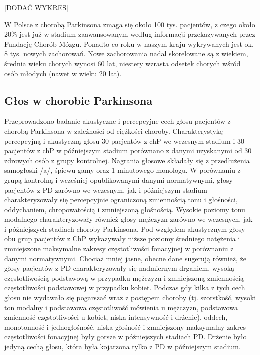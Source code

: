 [DODAĆ WYKRES]


W Polsce z chorobą Parkinsona zmaga się około 100 tys. pacjentów, z czego około 20\% jest już w stadium zaawansowanym
według informacji przekazywanych przez Fundację Chorób Mózgu.
Ponadto co roku w naszym kraju wykrywanych jest ok. 8 tys. nowych zachorowań.
Nowe zachorowania nadal skorelowane są z wiekiem, średnia wieku chorych wynosi 60 lat, niestety wzrasta odsetek chorych wśród osób młodych (nawet w wieku 20 lat).


\subsection{Głos w chorobie Parkinsona}
\label{subsec:glospd}

Przeprowadzono badanie akustyczne i percepcyjne cech głosu pacjentów z chorobą Parkinsona w zależności od ciężkości choroby.
Charakterystykę percepcyjną i akustyczną głosu 30 pacjentów z chP we wczesnym stadium i 30 pacjentów z chP w późniejszym
stadium porównano z danymi uzyskanymi od 30 zdrowych osób z grupy kontrolnej.
Nagrania głosowe składały się z przedłużenia samogłoski /a/, śpiewu gamy oraz 1-minutowego monologu.
W porównaniu z grupą kontrolną i wcześniej opublikowanymi danymi normatywnymi, głosy pacjentów z PD zarówno we wczesnym,
jak i późniejszym stadium charakteryzowały się percepcyjnie ograniczoną zmiennością tonu i głośności, oddychaniem,
chropowatością i zmniejszoną głośnością.
Wysokie poziomy tonu modalnego charakteryzowały również głosy mężczyzn zarówno we wczesnych, jak i późniejszych stadiach choroby Parkinsona.
Pod względem akustycznym głosy obu grup pacjentów z ChP wykazywały niższe poziomy średniego natężenia i zmniejszone maksymalne
zakresy częstotliwości fonacyjnej w porównaniu z danymi normatywnymi.
Chociaż mniej jasne, obecne dane sugerują również, że głosy pacjentów z PD charakteryzowały się nadmiernym drganiem, wysoką
częstotliwością podstawową w przypadku mężczyzn i zmniejszoną zmiennością częstotliwości podstawowej w przypadku kobiet.
Podczas gdy kilka z tych cech głosu nie wydawało się pogarszać wraz z postępem choroby (tj. szorstkość, wysoki ton modalny
i podstawowa częstotliwość mówienia u mężczyzn, podstawowa zmienność częstotliwości u kobiet, niska intensywność i drżenie),
oddech, monotonność i jednogłośność, niska głośność i zmniejszony maksymalny zakres częstotliwości fonacyjnej były gorsze
w późniejszych stadiach PD.
Drżenie było jedyną cechą głosu, która była kojarzona tylko z PD w późniejszym stadium.\cite{https://doi.org/10.1080/136828200410654}


